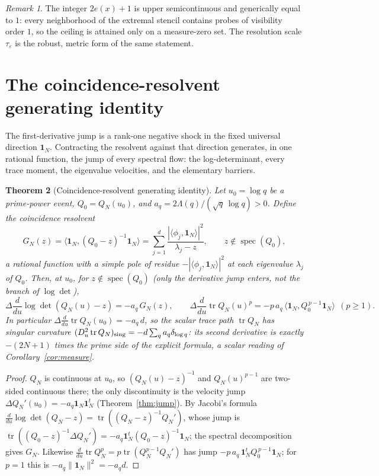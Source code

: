 \documentclass[11pt]{article}
\theoremstyle{plain}
\newtheorem{theorem}{Theorem}[section]
\theoremstyle{definition}
\theoremstyle{remark}
\newtheorem{remark}[theorem]{Remark}
\newcommand{\one}{\mathbf 1}
\newcommand{\Lam}{\Lambda}
\begin{document}
\begin{remark}
The integer $2e(x)+1$ is upper semicontinuous and generically equal to $1$: every
neighborhood of the extremal stencil contains probes of visibility order $1$, so
the ceiling is attained only on a measure-zero set. The resolution scale
$\tau_\varepsilon$ is the robust, metric form of the same statement.
\end{remark}

\section{The coincidence-resolvent generating identity}\label{sec:deflation}

The first-derivative jump is a rank-one negative shock in the fixed universal
direction $\one_N$. Contracting the resolvent against that direction generates,
in one rational function, the jump of every spectral flow: the log-determinant,
every trace moment, the eigenvalue velocities, and the elementary barriers.

\begin{theorem}[Coincidence-resolvent generating identity]\label{thm:generating}
Let $u_0=\log q$ be a prime-power event, $Q_0=Q_N(u_0)$, and
$a_q=2\Lam(q)/(\sqrt q\,\log q)>0$. Define the \emph{coincidence resolvent}
\[
        G_N(z)=\bigl\langle\one_N,(Q_0-z)^{-1}\one_N\bigr\rangle
        =\sum_{j=1}^d\frac{|\langle\phi_j,\one_N\rangle|^2}{\lambda_j-z},
        \qquad z\notin\operatorname{spec}(Q_0),
\]
a rational function with a simple pole of residue $-|\langle\phi_j,\one_N\rangle|^2$
at each eigenvalue $\lambda_j$ of $Q_0$. Then, at $u_0$, for $z\notin
\operatorname{spec}(Q_0)$ (only the derivative jump enters, not the branch of
$\log\det$),
\[
 \Delta\frac{d}{du}\log\det(Q_N(u)-z)=-a_q\,G_N(z),
 \qquad
 \Delta\frac{d}{du}\operatorname{tr}Q_N(u)^p=-p\,a_q\,
 \bigl\langle\one_N,Q_0^{\,p-1}\one_N\bigr\rangle\ \ (p\ge1).
\]
In particular $\Delta\frac{d}{du}\operatorname{tr}Q_N(u_0)=-a_q\,d$, so the scalar
trace path $\operatorname{tr}Q_N$ has singular curvature
$(D_u^2\operatorname{tr}Q_N)_{\rm sing}=-d\sum_q a_q\delta_{\log q}$: its second
derivative is exactly $-(2N+1)$ times the prime side of the explicit formula, a
scalar reading of Corollary~\ref{cor:measure}.
\end{theorem}

\begin{proof}
$Q_N$ is continuous at $u_0$, so $(Q_N(u)-z)^{-1}$ and $Q_N(u)^{p-1}$ are
two-sided continuous there; the only discontinuity is the velocity jump
$\Delta Q_N'(u_0)=-a_q\one_N\one_N^t$ (Theorem~\ref{thm:jump}). By Jacobi's
formula $\frac{d}{du}\log\det(Q_N-z)=\operatorname{tr}((Q_N-z)^{-1}Q_N')$, whose
jump is $\operatorname{tr}((Q_0-z)^{-1}\Delta Q_N')=-a_q\one_N^t(Q_0-z)^{-1}\one_N$;
the spectral decomposition gives $G_N$. Likewise
$\frac{d}{du}\operatorname{tr}Q_N^p=p\operatorname{tr}(Q_N^{p-1}Q_N')$ has jump
$-p\,a_q\,\one_N^tQ_0^{\,p-1}\one_N$; for $p=1$ this is $-a_q\|\one_N\|^2=-a_qd$.
\end{proof}
\end{document}
